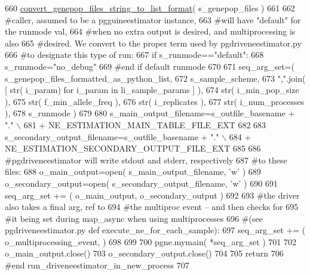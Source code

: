 \begin{DoxyCode}
660             \hyperlink{namespacenegui_1_1pgutilities_aed0f15b22462914445ffe1ec2a77cbc8}{convert\_genepop\_files\_string\_to\_list\_format}( 
      s\_genepop\_files )
661 
662     \textcolor{comment}{#caller, assumed to be a pgguineestimator instance,}
663     \textcolor{comment}{#will have "default" for the runmode val, }
664     \textcolor{comment}{#when no extra output is desired, and multiprocessing is also}
665     \textcolor{comment}{#desired.  We convert to the proper term used by pgdriveneestimator.py}
666     \textcolor{comment}{#to designate this type of run:}
667     \textcolor{keywordflow}{if} s\_runmode==\textcolor{stringliteral}{"default"}:
668         s\_runmode=\textcolor{stringliteral}{"no\_debug"}
669     \textcolor{comment}{#end if default runmode}
670 
671     seq\_arg\_set=( s\_genepop\_files\_formatted\_as\_python\_list,
672                         s\_sample\_scheme,
673                         \textcolor{stringliteral}{","}.join( [ str( i\_param) \textcolor{keywordflow}{for} i\_param \textcolor{keywordflow}{in} li\_sample\_params ] ),
674                         str( i\_min\_pop\_size ),
675                         str( f\_min\_allele\_freq ),
676                         str( i\_replicates ),
677                         str( i\_num\_processes ),
678                         s\_runmode )
679 
680     s\_main\_output\_filename=s\_outfile\_basename + \textcolor{stringliteral}{"."} \(\backslash\)
681             + NE\_ESTIMATION\_MAIN\_TABLE\_FILE\_EXT
682 
683     s\_secondary\_output\_filename=s\_outfile\_basename + \textcolor{stringliteral}{"."} \(\backslash\)
684             + NE\_ESTIMATION\_SECONDARY\_OUTPUT\_FILE\_EXT
685 
686     \textcolor{comment}{#pgdriveneestimator will write stdout and stderr, respectively}
687     \textcolor{comment}{#to these files:}
688     o\_main\_output=open( s\_main\_output\_filename, \textcolor{stringliteral}{'w'} )
689     o\_secondary\_output=open( s\_secondary\_output\_filename, \textcolor{stringliteral}{'w'} )
690 
691     seq\_arg\_set += ( o\_main\_output, o\_secondary\_output )
692     
693     \textcolor{comment}{#the driver also takes a final arg, ref to}
694     \textcolor{comment}{#the multiproc event -- and then checks for }
695     \textcolor{comment}{#it being set during map\_async when using multiprocesses}
696     \textcolor{comment}{#(see pgdriveneestimator.py def execute\_ne\_for\_each\_sample):}
697     seq\_arg\_set += ( o\_multiprocessing\_event, )
698 
699 
700     pgne.mymain( *seq\_arg\_set )
701 
702     o\_main\_output.close()
703     o\_secondary\_output.close()
704 
705     \textcolor{keywordflow}{return}
706 \textcolor{comment}{#end run\_driveneestimator\_in\_new\_process}
707 
\end{DoxyCode}
